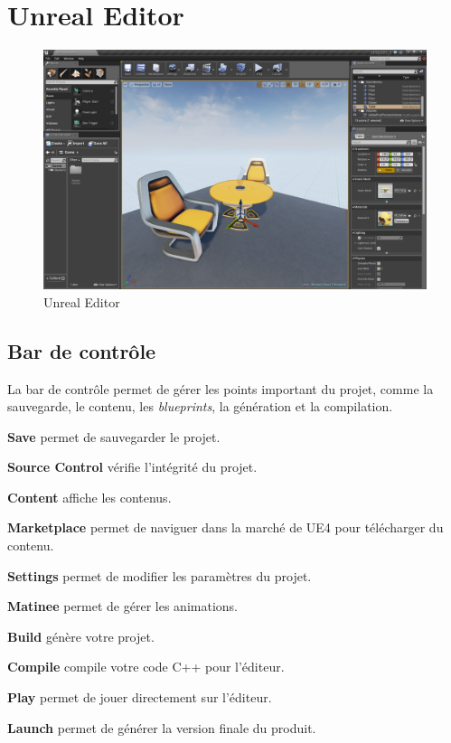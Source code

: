 \documentclass[11pt, a4paper, oneside]{article}
\begin{document}
\section{Unreal Editor}
\begin{center}
\begin{figure}[htp]
\includegraphics[scale=.39]{ue4editor}
\caption{Unreal Editor}
\end{figure}
\end{center}

\subsection{Bar de contrôle}
La bar de contrôle permet de gérer les points important du projet, comme la sauvegarde, le contenu, les \emph{blueprints}, la génération et la compilation.

\begin{description}
	\item{\textbf{Save}} permet de sauvegarder le projet.
	\item{\textbf{Source Control}} vérifie l'intégrité du projet.
	\item{\textbf{Content}} affiche les contenus.
	\item{\textbf{Marketplace}} permet de naviguer dans la marché de UE4 pour télécharger du contenu.
	\item{\textbf{Settings}} permet de modifier les paramètres du projet.
	\item{\textbf{Matinee}} permet de gérer les animations.
	\item{\textbf{Build}} génère votre projet.
	\item{\textbf{Compile}} compile votre code C++ pour l'éditeur.
	\item{\textbf{Play}} permet de jouer directement sur l'éditeur.
	\item{\textbf{Launch}} permet de générer la version finale du produit.
\end{description}
\end{document}
